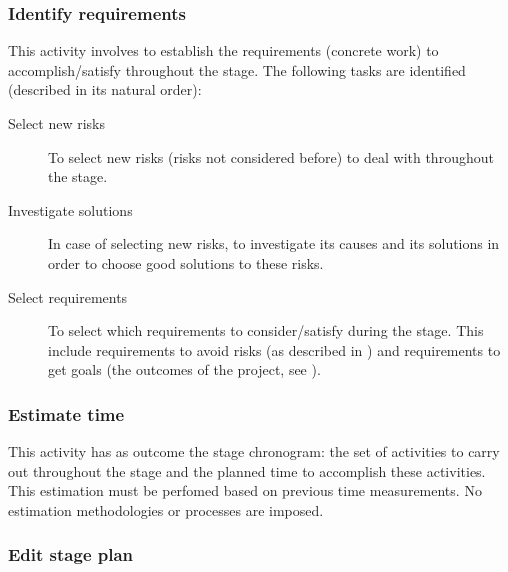 \documentclass[twocolumn]{article}
\begin{document}
\subsubsection{Identify requirements}
\label{sssec:identify-requirements}
This activity involves to establish the requirements (concrete work)
to accomplish/satisfy throughout the stage. The following tasks
are identified (described in its natural order):

\begin{description}
  \item[Select new risks] To select new risks (risks not considered
    before) to deal with throughout the stage.
  \item[Investigate solutions] In case of selecting new risks, to
    investigate its causes and its solutions in order to choose good
    solutions to these risks.
  \item[Select requirements] To select which requirements to
    consider/satisfy during the stage. This include requirements to
    avoid risks (as described in ) and
    requirements to get goals (the outcomes of the project, see
    \fav).
\end{description}

\subsubsection{Estimate time}
\label{sssec:estimate-time}
This activity has as outcome the stage chronogram: the set of
activities to carry out throughout the stage and the planned time to
accomplish these activities. This estimation must be perfomed based on
previous time measurements. No estimation methodologies or processes
are imposed.

\subsubsection{Edit stage plan}
\label{sssec:edit-stage-plan}
\end{document}
